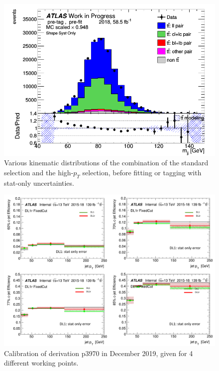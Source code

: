 \documentclass[letterpaper,12pt]{article}
\begin{document}
\begin{figure}[H]
\begin{minipage}[b]{.45\textwidth}
\centering
\includegraphics[width=1\textwidth]{Distribution_March_highpT/DataMC_mjj.png}
\end{minipage}
\caption{Various kinematic distributions of the combination of the standard selection and the high-$p_T$ selection, before fitting or tagging with stat-only uncertainties.} \label{fig:highpT_selection}
\end{figure}



\begin{figure}
\includegraphics[width=1\textwidth]{Dec_eff.png}
\caption{Calibration of derivation p3970 in December 2019, given for  4 different working points.}\label{fig:Dec_eff}
\end{figure}
\end{document}
